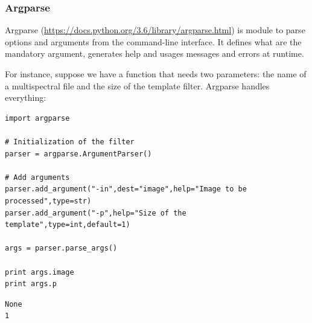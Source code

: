 \documentclass[a4paper,11pt,DIV=18]{scrartcl}
\begin{document}
\subsubsection{Argparse}
\label{sec:org77974d2}
Argparse (\url{https://docs.python.org/3.6/library/argparse.html}) is module
to parse  options and  arguments from  the command-line  interface. It
defines what  are the  mandatory argument,  generates help  and usages
messages and errors at runtime.

For instance,  suppose we have  a function that needs  two parameters:
the  name  of a  multispectral  file  and  the  size of  the  template
filter. Argparse handles everything:

\begin{verbatim}
import argparse

# Initialization of the filter
parser = argparse.ArgumentParser()

# Add arguments
parser.add_argument("-in",dest="image",help="Image to be processed",type=str)
parser.add_argument("-p",help="Size of the template",type=int,default=1)

args = parser.parse_args()

print args.image
print args.p
\end{verbatim}

\begin{verbatim}
None
1
\end{verbatim}
\end{document}

